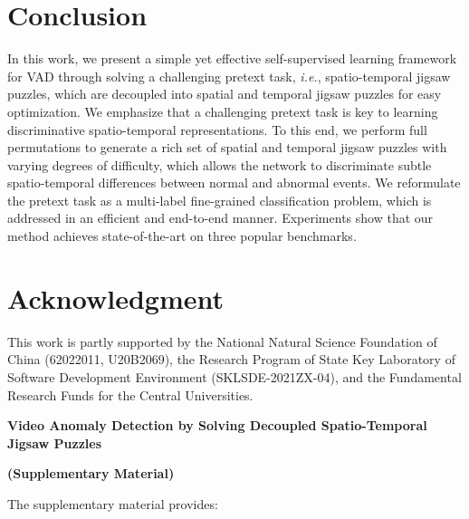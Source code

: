 \documentclass[runningheads]{llncs}
\begin{document}
\section{Conclusion}
In this work, we present a simple yet effective self-supervised learning framework for VAD through solving a challenging pretext task, \emph{i.e.}, spatio-temporal jigsaw puzzles, which are decoupled into spatial and temporal jigsaw puzzles for easy optimization. We emphasize that a challenging pretext task is key to learning discriminative spatio-temporal representations. To this end, we perform full permutations to generate a rich set of spatial and temporal jigsaw puzzles with varying degrees of difficulty, which allows the network to discriminate subtle spatio-temporal differences between normal and abnormal events. We reformulate the pretext task as a multi-label fine-grained classification problem, which is addressed in an efficient and end-to-end manner. Experiments show that our method achieves state-of-the-art on three popular benchmarks. 


\section*{Acknowledgment}
This work is partly supported by the National Natural Science Foundation of China (62022011, U20B2069), the Research Program of State Key Laboratory of Software Development Environment (SKLSDE-2021ZX-04), and the Fundamental Research Funds for the Central Universities.

\clearpage








\appendix

\onecolumn
\clearpage

\begin{center}{\bf {\Large Video Anomaly Detection by Solving Decoupled Spatio-Temporal Jigsaw Puzzles}}
\end{center}
\begin{center}{\bf {\Large (Supplementary Material)}}
\end{center}






The supplementary material provides: 
\end{document}
